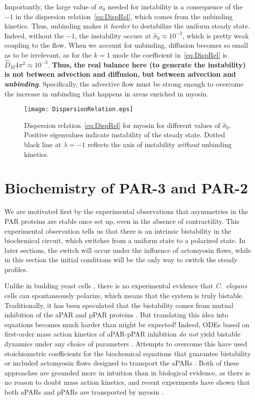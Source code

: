 \documentclass[11pt]{article}
\newcommand{\6}[1]{#1_{\text{6}}}
\newcommand{\3}[1]{#1_{\text{3}}}
\begin{document}
Importantly, the large value of $\sigma_0$ needed for instability is a consequence of the $-1$ in the dispersion relation\ \eqref{eq:DispRel}, which comes from the unbinding kinetics. Thus, unbinding makes it \emph{harder} to destabilize the uniform steady state. Indeed, without the $-1$, the instability occurs at $\hat{\sigma}_0 \approx 10^{-3}$, which is pretty weak coupling to the flow. When we account for unbinding, diffusion becomes so small as to be irrelevant, as for the $k=1$ mode the coefficient in\ \eqref{eq:DispRel} is $\hat{D}_M 4 \pi^2 \approx 10^{-3}$. \textbf{Thus, the real balance here (to generate the instability) is not between advection and diffusion, but between advection and \emph{unbinding}}. Specifically, the advective flow must be strong enough to overcome the increase in unbinding that happens in areas enriched in myosin. 

\begin{figure}
\centering
\texttt{[image: DispersionRelation.eps]}
\caption{\label{fig:DispRelMy}Dispersion relation\ \eqref{eq:DispRel} for myosin for different values of $\hat{\sigma}_0$. Positive eigenvalues indicate instability of the steady state. Dotted black line at $\lambda=-1$ reflects the axis of instability \emph{without} unbinding kinetics.}
\end{figure}

\section{Biochemistry of PAR-3 and PAR-2 \label{sec:Biochem}}
We are motivated first by the experimental observations that asymmetries in the PAR proteins are stable once set up, even in the absence of contractility. This experimental observation tells us that there is an intrinsic bistability in the biochemical circuit, which switches from a uniform state to a polarized state. In later sections, the switch will occur under the influence of actomyosin flows, while in this section the initial conditions will be the only way to switch the steady profiles.

Unlike in budding yeast cells \cite{mogilner2012cell}, there is no experimental evidence that \emph{C.\ elegans} cells can spontaneously polarize, which means that the system is truly bistable. Traditionally, it has been speculated that the bistability comes from mutual inhibition of the aPAR and pPAR proteins \cite{halatek2018self, trong2014parameter}. But translating this idea into equations becomes much harder than might be expected! Indeed, ODEs based on first-order mass action kinetics of aPAR-pPAR inhibition \emph{do not} yield bistable dynamics under any choice of parameters \cite{dawes20113}. Attempts to overcome this have used stoichiometric coefficients for the biochemical equations that guarantee bistability \cite{goehring2011polarization, gross2019guiding} or included actomyosin flows designed to transport the aPARs \cite{TH2008}. Both of these approaches are grounded more in intuition than in biological evidence, as there is no reason to doubt mass action kinetics, and recent experiments have shown that both aPARs and pPARs are transported by myosin \cite{illukkumbura2023design}. 
\end{document}
